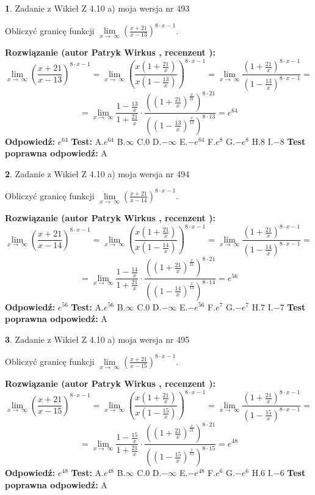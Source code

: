 \documentclass[12pt, a4paper]{article}
\theoremstyle{definition} %
\newtheorem{zad}{}
\newcommand{\zadStart}[1]{\begin{zad}#1\newline}
\newcommand{\zadStop}{\end{zad}}
\newcommand{\rozwStart}[2]{\noindent \textbf{Rozwiązanie (autor #1 , recenzent #2): }\newline}
\newcommand{\rozwStop}{\newline}
\newcommand{\odpStart}{\noindent \textbf{Odpowiedź:}\newline}
\newcommand{\odpStop}{\newline}
\newcommand{\testStart}{\noindent \textbf{Test:}\newline}
\newcommand{\testStop}{\newline}
\newcommand{\kluczStart}{\noindent \textbf{Test poprawna odpowiedź:}\newline}
\newcommand{\kluczStop}{\newline}
\begin{document}
\zadStart{Zadanie z Wikieł Z 4.10 a) moja wersja nr 493}

Obliczyć granicę funkcji  $\lim\limits_{x\to\ \infty}(\frac{x+21}{x-13})^{8\cdot x-1}$.
\zadStop
\rozwStart{Patryk Wirkus}{}
$$\lim\limits_{x\to\ \infty}(\frac{x+21}{x-13})^{8\cdot x-1} = \lim\limits_{x\to\ \infty}(\frac{x(1+\frac{21}{x})}{x(1-\frac{13}{x})})^{8\cdot x-1}=\lim\limits_{x\to\ \infty}\frac{(1+\frac{21}{x})^{8\cdot x-1}}{(1-\frac{13}{x})^{8\cdot x-1}}=$$
$$=\lim\limits_{x\to\ \infty}\frac{1-\frac{13}{x}}{1+\frac{21}{x}}\cdot\frac{((1+\frac{21}{x})^{\frac{x}{21}})^{8\cdot21}}{((1-\frac{13}{x})^{\frac{x}{13}})^{8\cdot13}}=e^{64}$$
\rozwStop
\odpStart
$e^{64}$
\odpStop
\testStart
A.$e^{64}$ B.$\infty$ C.$0$ D.$-\infty$ E.$-e^{64}$
F.$e^{8}$ G.$-e^{8}$
H.$8$
I.$-8$
\testStop
\kluczStart
A
\kluczStop



\zadStart{Zadanie z Wikieł Z 4.10 a) moja wersja nr 494}

Obliczyć granicę funkcji  $\lim\limits_{x\to\ \infty}(\frac{x+21}{x-14})^{8\cdot x-1}$.
\zadStop
\rozwStart{Patryk Wirkus}{}
$$\lim\limits_{x\to\ \infty}(\frac{x+21}{x-14})^{8\cdot x-1} = \lim\limits_{x\to\ \infty}(\frac{x(1+\frac{21}{x})}{x(1-\frac{14}{x})})^{8\cdot x-1}=\lim\limits_{x\to\ \infty}\frac{(1+\frac{21}{x})^{8\cdot x-1}}{(1-\frac{14}{x})^{8\cdot x-1}}=$$
$$=\lim\limits_{x\to\ \infty}\frac{1-\frac{14}{x}}{1+\frac{21}{x}}\cdot\frac{((1+\frac{21}{x})^{\frac{x}{21}})^{8\cdot21}}{((1-\frac{14}{x})^{\frac{x}{14}})^{8\cdot14}}=e^{56}$$
\rozwStop
\odpStart
$e^{56}$
\odpStop
\testStart
A.$e^{56}$ B.$\infty$ C.$0$ D.$-\infty$ E.$-e^{56}$
F.$e^{7}$ G.$-e^{7}$
H.$7$
I.$-7$
\testStop
\kluczStart
A
\kluczStop



\zadStart{Zadanie z Wikieł Z 4.10 a) moja wersja nr 495}

Obliczyć granicę funkcji  $\lim\limits_{x\to\ \infty}(\frac{x+21}{x-15})^{8\cdot x-1}$.
\zadStop
\rozwStart{Patryk Wirkus}{}
$$\lim\limits_{x\to\ \infty}(\frac{x+21}{x-15})^{8\cdot x-1} = \lim\limits_{x\to\ \infty}(\frac{x(1+\frac{21}{x})}{x(1-\frac{15}{x})})^{8\cdot x-1}=\lim\limits_{x\to\ \infty}\frac{(1+\frac{21}{x})^{8\cdot x-1}}{(1-\frac{15}{x})^{8\cdot x-1}}=$$
$$=\lim\limits_{x\to\ \infty}\frac{1-\frac{15}{x}}{1+\frac{21}{x}}\cdot\frac{((1+\frac{21}{x})^{\frac{x}{21}})^{8\cdot21}}{((1-\frac{15}{x})^{\frac{x}{15}})^{8\cdot15}}=e^{48}$$
\rozwStop
\odpStart
$e^{48}$
\odpStop
\testStart
A.$e^{48}$ B.$\infty$ C.$0$ D.$-\infty$ E.$-e^{48}$
F.$e^{6}$ G.$-e^{6}$
H.$6$
I.$-6$
\testStop
\kluczStart
A
\kluczStop
\end{document}
